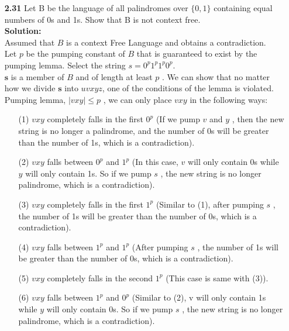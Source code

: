 \documentclass[12pt]{letter}
\begin{document}
\begin{enumerate}
\ \\ %
\item[\textbf{2.31}] Let B be the language of all palindromes over $\{0,1\}$ containing equal numbers of 0s and 1s. Show that B is not context free.
\leavevmode \\
\textbf{Solution:} \\
Assumed that $B$ is a context Free Language and obtains a contradiction. \\
Let $p$ be the pumping constant of $B$ that is guaranteed to exist by the pumping lemma. Select the string $s=0^p1^p1^p0^p$. \\
$\textbf{s}$ is a member of $B$ and of length at least $p$ . We can show that no matter how we divide $\textbf{s}$ into $uvxyz$, one of the conditions of the lemma is violated.
Pumping lemma, $|vxy| \leq p$ , we can only place $vxy$ in the following ways:
		\begin{enumerate}
			\item[(1)] $vxy$ completely falls in the first $0^p$ (If we pump $v$ and $y$ , then the new string is no longer a palindrome, and the number of 0s will be greater than the number of 1s, which is a contradiction). \\
			
			\item[(2)] $vxy$ falls between $0^p$ and $1^p$ (In this case, $v$ will only contain 0s while $y$ will only contain 1s. So if we pump $s$ , the new string is no longer palindrome, which is a contradiction). \\

			\item[(3)] $vxy$ completely falls in the first $1^p$ (Similar to (1), after pumping $s$ , the number of 1s will be greater than the number of 0s, which is a contradiction). \\

			\item[(4)] $vxy$ falls between $1^p$ and $1^p$ (After pumping $s$ , the number of 1s will be greater than the number of 0s, which is a contradiction). \\

			\item[(5)] $vxy$ completely falls in the second $1^p$ (This case is same with (3)). \\ 

			\item[(6)] $vxy$ falls between $1^p$ and $0^p$ (Similar to (2), v will only contain 1s while $y$ will only contain 0s. So if we pump $s$ , the new string is no longer palindrome, which is a contradiction). \\


\end{enumerate}
\end{enumerate}
\end{document}
